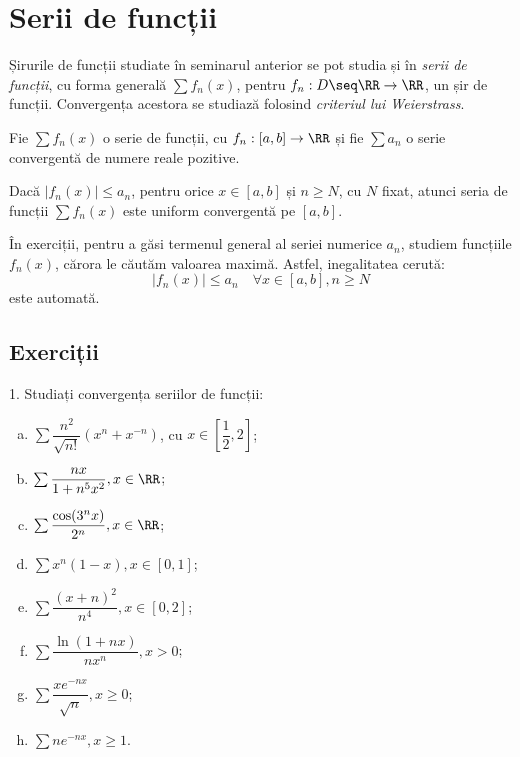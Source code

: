 \chapter{Serii de funcții}

Șirurile de funcții studiate în seminarul anterior se pot studia și în \emph{serii de funcții},
cu forma generală $ \sum f_n(x) $, pentru $ f_n : D \seq \RR \to \RR $, un șir de funcții.
Convergența acestora se studiază folosind \emph{criteriul lui Weierstrass}.

\begin{theorem}[Weierstrass]\label{thm:weier}
  Fie $ \sum f_n(x) $ o serie de funcții, cu $ f_n : [a, b] \to \RR $ și fie
  $ \sum a_n $ o serie convergentă de numere reale pozitive.

  Dacă $ | f_n(x) | \leq a_n $, pentru orice $ x \in [a, b] $ și $ n \geq N $, cu $ N $
  fixat, atunci seria de funcții $ \sum f_n(x) $ este uniform convergentă pe $ [a, b] $.
\end{theorem}

În exerciții, pentru a găsi termenul general al seriei numerice $ a_n $, studiem
funcțiile $ f_n(x) $, cărora le căutăm valoarea maximă. Astfel, inegalitatea cerută:
\[
  | f_n(x) | \leq a_n \quad \forall x \in [a, b], n \geq N
\]
este automată.

\section{Exerciții}

1. Studiați convergența seriilor de funcții:
\begin{enumerate}[(a)]
\item $ \sum \dfrac{n^2}{\sqrt{n!}} (x^n + x^{-n}) $, cu $ x \in \left[ \dfrac{1}{2}, 2 \right] $;
\item $ \sum \dfrac{nx}{1 + n^5 x^2}, x \in \RR $;
\item $ \sum \dfrac{\cos(3^n x)}{2^n}, x \in \RR $;
\item $ \sum x^n(1 - x), x \in [0, 1] $;
\item $ \sum \dfrac{(x + n)^2}{n^4}, x \in [0, 2] $;
\item $ \sum \dfrac{\ln(1 + nx)}{nx^n}, x > 0 $;
\item $ \sum \dfrac{xe^{-nx}}{\sqrt{n}}, x \geq 0 $;
\item $ \sum ne^{-nx}, x \geq 1 $.
\end{enumerate}

